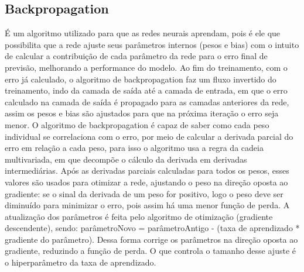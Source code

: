 \subsection{Backpropagation}
É um algoritmo utilizado para que as redes neurais aprendam, pois é ele que possibilita que a rede ajuste seus parâmetros internos (pesos e bias) com o intuito de calcular a contribuição de cada parâmetro da rede para o erro final de previsão, melhorando a performance do modelo.
Ao fim do treinamento, com o erro já calculado, o algoritmo de backpropagation faz um fluxo invertido do treinamento, indo da camada de saída até a camada de entrada, em que o erro calculado na camada de saída é propagado para as camadas anteriores da rede, assim os pesos e bias são ajustados para que na próxima iteração o erro seja menor.
O algoritmo de backpropagation é capaz de saber como cada peso individual se correlaciona com o erro, por meio de calcular a derivada parcial do erro em relação a cada peso, para isso o algoritmo usa a regra da cadeia multivariada, em que decompõe o cálculo da derivada em derivadas intermediárias. Após as derivadas parciais calculadas para todos os pesos, esses valores são usados para otimizar a rede, ajustando o peso na direção oposta ao gradiente: se o sinal da derivada de um peso for positivo, logo o peso deve ser diminuído para minimizar o erro, pois assim há uma menor função de perda.
A atualização dos parâmetros é feita pelo algoritmo de otimização (gradiente descendente), sendo: parâmetroNovo = parâmetroAntigo - (taxa de aprendizado * gradiente do parâmetro). Dessa forma corrige os parâmetros na direção oposta ao gradiente, reduzindo a função de perda. O que controla o tamanho desse ajuste é o hiperparâmetro da taxa de aprendizado.


